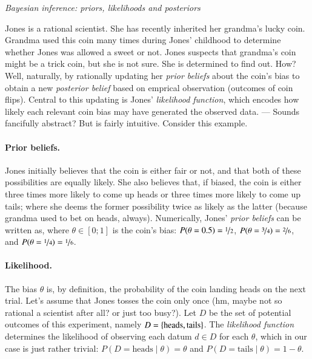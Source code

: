 \documentclass[nobib]{tufte-handout}
\begin{document}
\begin{InfoBox}[t]
\centering
\colorbox{mygray}{\centering
  \begin{minipage}{1.0\textwidth}

    \emph{Bayesian inference: priors, likelihoods and posteriors}
    \medskip

    Jones is a rational scientist. She has recently inherited her grandma's lucky coin. Grandma
    used this coin many times during Jones' childhood to determine whether Jones was allowed a
    sweet or not. Jones suspects that grandma's coin might be a trick coin, but she is not
    sure. She is determined to find out. How? Well, naturally, by rationally updating her
    \emph{prior beliefs} about the coin's bias to obtain a new \emph{posterior belief} based on
    emprical observation (outcomes of coin flips). Central to this updating is Jones'
    \emph{likelihood function}, which encodes how likely each relevant coin bias may have
    generated the observed data. --- Sounds fancifully abstract? But is fairly intuitive.
    Consider this example.
    
    \paragraph{Prior beliefs.} Jones initially believes that the coin is either fair or not, and that
    both of these possibilities are equally likely. She also believes that, if biased, the coin
    is either three times more likely to come up heads or three times more likely to come up
    tails; where she deems the former possibility twice as likely as the latter (because
    grandma used to bet on heads, always). Numerically, Jones' \emph{prior beliefs} can be
    written as, where $\theta \in [0;1]$ is the coin's bias: $P(\theta = 0.5) =
    \nicefrac{1}{2}$, $P(\theta = \nicefrac{3}{4}) = \nicefrac{2}{6}$, and $P(\theta =
    \nicefrac{1}{4}) = \nicefrac{1}{6}$.

    \paragraph{Likelihood.} The bias $\theta$ is, by definition, the probability of the coin
    landing heads on the next trial. Let's assume that Jones tosses the coin only once (hm,
    maybe not so rational a scientist after all? or just too busy?). Let $D$ be the set of
    potential outcomes of this experiment, namely $D = \left\{\text{heads}, \text{tails}\right\}$. The
    \emph{likelihood function} determines the likelihood of observing each datum $d \in D$ for
    each $\theta$, which in our case is just rather trivial: $P(D = \text{heads} \mid \theta) =
    \theta$ and $P(D = \text{tails} \mid \theta) = 1 - \theta$.


\end{minipage}}
\end{InfoBox}
\end{document}
